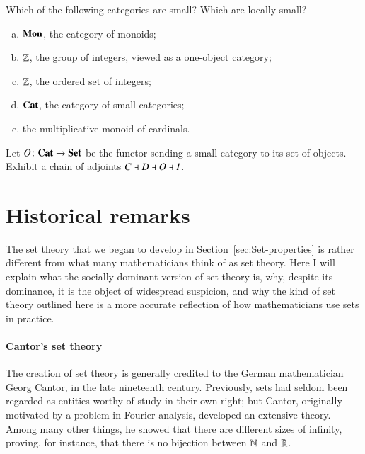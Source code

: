 \begin{question}
Which of the following categories are small?  Which are locally small?
%
\begin{enumerate}[(b)]
\item
$\mathbf{Mon}$, the category of monoids;

\item
$\mathbb{Z}$, the group of integers, viewed as a one-object category;

\item
$\mathbb{Z}$, the ordered set of integers;

\item
$\mathbf{Cat}$, the category of small categories;

\item
the multiplicative monoid of cardinals.
\end{enumerate}
\end{question}


\begin{question}
\label{ex:cdoi}
%
%
%
Let $O\from \Cat \to \Set$ be the functor sending a small category to its
set%
%
%
of objects.  Exhibit a chain of adjoints $C \dashv D \dashv O \dashv I$.
\end{question}



\section{Historical remarks}
\label{sec:set-history}


%
%
The set theory that we began to develop in Section~\ref{sec:Set-properties}
is rather different from what many mathematicians think of as set theory.
Here I will explain what the socially dominant version of set theory is,
why, despite its dominance, it is the object of widespread suspicion, and
why the kind of set theory outlined here is a more accurate reflection of
how mathematicians use sets in practice.

\paragraph*{Cantor's set theory} The creation of set theory is generally
credited to the German mathematician Georg Cantor,%
%
%
in the late nineteenth century.  Previously, sets had seldom been regarded
as entities worthy of study in their own right; but Cantor, originally
motivated by a problem in Fourier%
%
%
analysis, developed an extensive theory.  Among many other things, he
showed that there are different sizes of infinity, proving, for instance,
that there is no bijection between $\mathbb{N}$ and $\mathbb{R}$.

